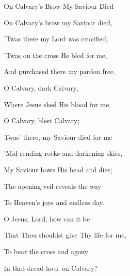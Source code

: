 \documentclass[12pt]{book}
\newcommand{\WBColBrk}{%
  \ifWordBk%
  \newpage%
\fi}
\begin{document}
\begin{song}{On Calvary's Brow My Saviour Died}{}
  {\SBPubDom}
  {}
  {}
  {}

  \begin{SBVerse}
    On Calvary's brow my Saviour died,

    'Twas there my Lord was crucified;

    'Twas on the cross He bled for me,

    And purchased there my pardon free.
  \end{SBVerse}

  \begin{SBOpGroup}
    O Calvary, dark Calvary,

    Where Jesus shed His blood for me.

    O Calvary, blest Calvary;

    Twas' there, my Saviour died for me
  \end{SBOpGroup}

  \begin{SBVerse}
    'Mid rending rocks and darkening skies,

    My Saviour bows His head and dies;

    The opening veil reveals the way

    To Heaven's joys and endless day.
  \end{SBVerse}

  \begin{SBVerse}
    O Jesus, Lord, how can it be

    That Thou shouldst give Thy life for me,

    To bear the cross and agony

    In that dread hour on Calvary?
  \end{SBVerse}
\end{song}

\WBColBrk
\end{document}
